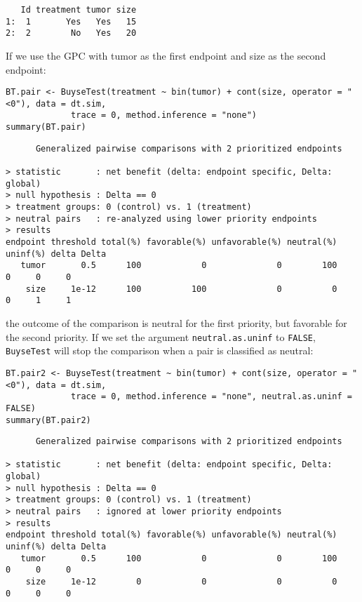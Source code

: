 \documentclass[12pt]{article}
\begin{document}
\begin{verbatim}
   Id treatment tumor size
1:  1       Yes   Yes   15
2:  2        No   Yes   20
\end{verbatim}

\clearpage

If we use the GPC with tumor as the first endpoint and size as the
second endpoint:
\lstset{language=r,label= ,caption= ,captionpos=b,numbers=none}
\begin{lstlisting}
BT.pair <- BuyseTest(treatment ~ bin(tumor) + cont(size, operator = "<0"), data = dt.sim,
		     trace = 0, method.inference = "none")
summary(BT.pair)
\end{lstlisting}

\begin{verbatim}
      Generalized pairwise comparisons with 2 prioritized endpoints

> statistic       : net benefit (delta: endpoint specific, Delta: global) 
> null hypothesis : Delta == 0 
> treatment groups: 0 (control) vs. 1 (treatment) 
> neutral pairs   : re-analyzed using lower priority endpoints
> results
endpoint threshold total(%) favorable(%) unfavorable(%) neutral(%) uninf(%) delta Delta
   tumor       0.5      100            0              0        100        0     0     0
    size     1e-12      100          100              0          0        0     1     1
\end{verbatim}

the outcome of the comparison is neutral for the first priority, but
favorable for the second priority. If we set the argument
\texttt{neutral.as.uninf} to \texttt{FALSE}, \texttt{BuyseTest} will stop the comparison
when a pair is classified as neutral:
\lstset{language=r,label= ,caption= ,captionpos=b,numbers=none}
\begin{lstlisting}
BT.pair2 <- BuyseTest(treatment ~ bin(tumor) + cont(size, operator = "<0"), data = dt.sim,
		     trace = 0, method.inference = "none", neutral.as.uninf = FALSE)
summary(BT.pair2)
\end{lstlisting}

\begin{verbatim}
      Generalized pairwise comparisons with 2 prioritized endpoints

> statistic       : net benefit (delta: endpoint specific, Delta: global) 
> null hypothesis : Delta == 0 
> treatment groups: 0 (control) vs. 1 (treatment) 
> neutral pairs   : ignored at lower priority endpoints
> results
endpoint threshold total(%) favorable(%) unfavorable(%) neutral(%) uninf(%) delta Delta
   tumor       0.5      100            0              0        100        0     0     0
    size     1e-12        0            0              0          0        0     0     0
\end{verbatim}
\end{document}
